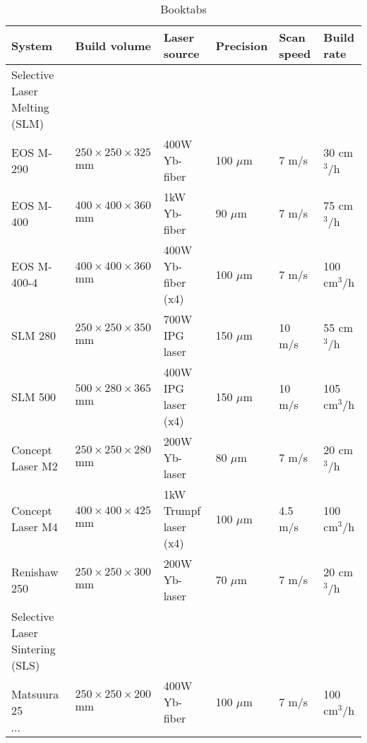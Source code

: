 \documentclass[10pt,a4paper]{article}
\begin{document}
\begin{table}[h]
	\caption{\\ Booktabs}
	\begin{tabular}{@{}llllll@{}}
		\toprule
		\textbf{System} & \textbf{Build volume} & \textbf{Laser source} & \textbf{Precision} & \textbf{Scan speed} & \textbf{Build rate}\\
		\midrule
		Selective Laser Melting (SLM) & & & & & \\
		\qquad EOS M-290   & $250 \times 250 \times 325$ mm & 400W Yb-fiber 		& 100 $\mu$m & 7 m/s & 30 cm$^3$/h\\
		\qquad EOS M-400   & $400 \times 400 \times 360$ mm & 1kW Yb-fiber 			& 90 $\mu$m & 7 m/s & 75 cm$^3$/h \\
		\vspace{2mm}
		\qquad EOS M-400-4 & $400 \times 400 \times 360$ mm & 400W Yb-fiber (x4) 	& 100 $\mu$m & 7 m/s & 100 cm$^3$/h\\
		\qquad SLM 280     & $250 \times 250 \times 350$ mm & 700W IPG laser 		& 150 $\mu$m & 10 m/s & 55 cm$^3$/h\\
		\vspace{2mm}
		\qquad SLM 500     & $500 \times 280 \times 365$ mm & 400W IPG laser (x4) 	& 150 $\mu$m & 10 m/s & 105 cm$^3$/h\\
		
		\qquad Concept Laser M2 & $250 \times 250 \times 280$ mm & 200W Yb-laser 		& 80 $\mu$m & 7 m/s & 20 cm$^3$/h\\
		\vspace{2mm}
		\qquad Concept Laser M4 & $400 \times 400 \times 425$ mm & 1kW Trumpf laser (x4) 		& 100 $\mu$m & 4.5 m/s & 100 cm$^3$/h\\
		\vspace{2mm}
		\qquad Renishaw 250 & $250 \times 250 \times 300$ mm & 200W Yb-laser 		& 70 $\mu$m & 7 m/s & 20 cm$^3$/h\\
		Selective Laser Sintering (SLS) & & & & & \\
		\qquad Matsuura 25   & $250 \times 250 \times 200$ mm & 400W Yb-fiber & 100 $\mu$m & 7 m/s & 100 cm$^3$/h\\
		\qquad $\cdots$  & & & & & \\
		\bottomrule
	\end{tabular}
\end{table}
\end{document}
